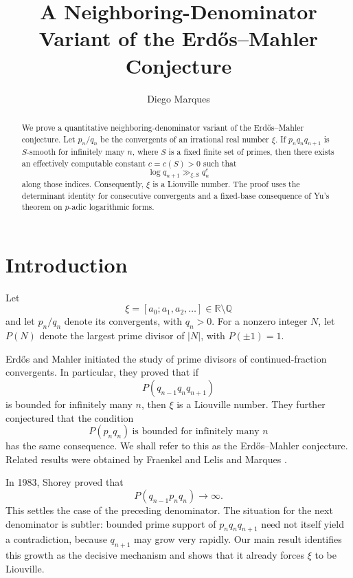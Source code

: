 \documentclass[11pt]{amsart}
\title[Neighbouring denominators and Erd\H{o}s--Mahler]
{A Neighboring-Denominator Variant of the Erd\H{o}s--Mahler Conjecture}
\author{Diego Marques}
\theoremstyle{remark}
\newcommand{\Q}{\mathbb Q}
\newcommand{\R}{\mathbb R}
\begin{document}
\begin{abstract}
We prove a quantitative neighboring-denominator variant of the
Erd\H{o}s--Mahler conjecture. Let $p_n/q_n$ be the convergents of an
irrational real number $\xi$. If $p_nq_nq_{n+1}$ is $S$-smooth for
infinitely many $n$, where $S$ is a fixed finite set of primes, then
there exists an effectively computable constant $c=c(S)>0$ such that
\[
\log q_{n+1}\gg_{\xi,S} q_n^c
\]
along those indices. Consequently, $\xi$ is a Liouville number. The
proof uses the determinant identity for consecutive convergents and a
fixed-base consequence of Yu's theorem on $p$-adic logarithmic forms.
\end{abstract}


\maketitle

\section{Introduction}

Let
\[
 \xi=[a_0;a_1,a_2,\ldots]\in\R\setminus\Q
\]
and let $p_n/q_n$ denote its convergents, with $q_n>0$. For a nonzero
integer $N$, let $P(N)$ denote the largest prime divisor of $|N|$, with
$P(\pm1)=1$.

Erd\H{o}s and Mahler \cite{ErdosMahler1939} initiated the study of prime
divisors of continued-fraction convergents. In particular, they proved
that if
\begin{equation}\label{eq:EM-three}
 P(q_{n-1}q_nq_{n+1})
\end{equation}
is bounded for infinitely many $n$, then $\xi$ is a Liouville number. They further conjectured that the condition
\begin{equation}\label{eq:EM-conj}
 P(p_nq_n)\ \text{is bounded for infinitely many }n
\end{equation}
has the same consequence. We shall refer to this as the Erdős--Mahler conjecture. Related results were obtained by Fraenkel
\cite{Fraenkel1962,Fraenkel1964} and Lelis and Marques \cite{LelisMarques2017}. 

In 1983, Shorey \cite[p.~132]{Shorey1983} proved that
\[
 P(q_{n-1}p_nq_n)\longrightarrow\infty.
\]
This settles the case of the preceding denominator. The situation for the
next denominator is subtler: bounded prime support of $p_nq_nq_{n+1}$
need not itself yield a contradiction, because $q_{n+1}$ may grow very
rapidly. Our main result identifies this growth as the decisive mechanism
and shows that it already forces $\xi$ to be Liouville. 
\end{document}

